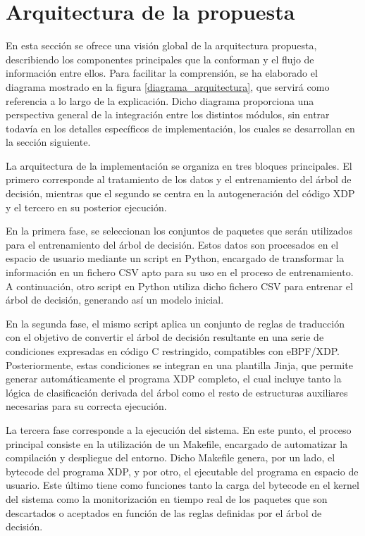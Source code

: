 \section{Arquitectura de la propuesta}

En esta sección se ofrece una visión global de la arquitectura propuesta, describiendo los componentes principales que la conforman y el flujo de información entre ellos. Para facilitar la comprensión, se ha elaborado el diagrama mostrado en la figura \ref{diagrama_arquitectura}, que servirá como referencia a lo largo de la explicación. Dicho diagrama proporciona una perspectiva general de la integración entre los distintos módulos, sin entrar todavía en los detalles específicos de implementación, los cuales se desarrollan en la sección siguiente.

La arquitectura de la implementación se organiza en tres bloques principales. El primero corresponde al tratamiento de los datos y el entrenamiento del árbol de decisión, mientras que el segundo se centra en la autogeneración del código XDP y el tercero en su posterior ejecución.

En la primera fase, se seleccionan los conjuntos de paquetes que serán utilizados para el entrenamiento del árbol de decisión. Estos datos son procesados en el espacio de usuario mediante un script en Python, encargado de transformar la información en un fichero CSV apto para su uso en el proceso de entrenamiento. A continuación, otro script en Python utiliza dicho fichero CSV para entrenar el árbol de decisión, generando así un modelo inicial.

En la segunda fase, el mismo script aplica un conjunto de reglas de traducción con el objetivo de convertir el árbol de decisión resultante en una serie de condiciones expresadas en código C restringido, compatibles con eBPF/XDP. Posteriormente, estas condiciones se integran en una plantilla Jinja, que permite generar automáticamente el programa XDP completo, el cual incluye tanto la lógica de clasificación derivada del árbol como el resto de estructuras auxiliares necesarias para su correcta ejecución.

La tercera fase corresponde a la ejecución del sistema. En este punto, el proceso principal consiste en la utilización de un Makefile, encargado de automatizar la compilación y despliegue del entorno. Dicho Makefile genera, por un lado, el bytecode del programa XDP, y por otro, el ejecutable del programa en espacio de usuario. Este último tiene como funciones tanto la carga del bytecode en el kernel del sistema como la monitorización en tiempo real de los paquetes que son descartados o aceptados en función de las reglas definidas por el árbol de decisión.

